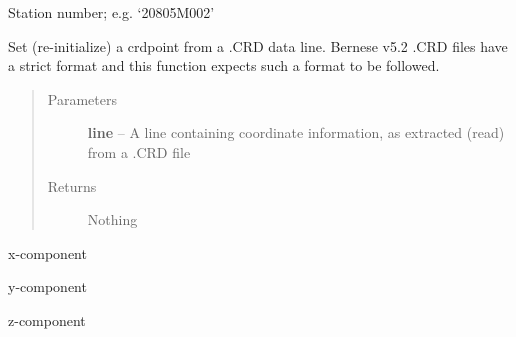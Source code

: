 \documentclass[letterpaper,10pt,english]{sphinxmanual}
\begin{document}
\begin{fulllineitems}
\begin{fulllineitems}
\end{fulllineitems}


\begin{fulllineitems}
\label{bcrd:bcrd.crdpoint.number_}
Station number; e.g. `20805M002'

\end{fulllineitems}


\begin{fulllineitems}
\label{bcrd:bcrd.crdpoint.setFromCrdLine}
Set (re-initialize) a crdpoint from a .CRD data line. Bernese v5.2
.CRD files have a strict format and this function expects such a
format to be followed.
\begin{quote}\begin{description}
\item[{Parameters}] \leavevmode
\textbf{line} -- A line containing coordinate information, as extracted
(read) from a .CRD file

\item[{Returns}] \leavevmode
Nothing

\end{description}\end{quote}

\end{fulllineitems}


\begin{fulllineitems}
\label{bcrd:bcrd.crdpoint.xcmp_}
x-component

\end{fulllineitems}


\begin{fulllineitems}
\label{bcrd:bcrd.crdpoint.ycmp_}
y-component

\end{fulllineitems}


\begin{fulllineitems}
\label{bcrd:bcrd.crdpoint.zcmp_}
z-component

\end{fulllineitems}


\end{fulllineitems}
\end{document}
